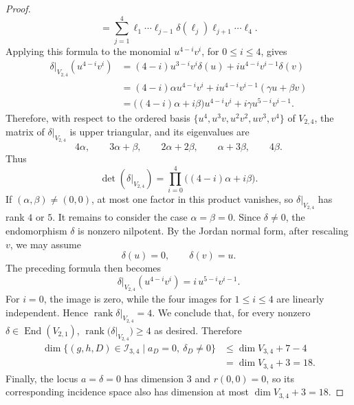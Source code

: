 \documentclass[10pt,a4paper]{amsart}
\DeclareMathOperator{\rank}{rank}
\numberwithin{equation}{section}
\theoremstyle{plain}
\theoremstyle{definition}
\theoremstyle{plain}
\theoremstyle{definition}
\begin{document}
\begin{proof}
\[=
\sum_{j=1}^4
\ell_1\cdots\ell_{j-1}\delta(\ell_j)
\ell_{j+1}\cdots\ell_4.
\]
Applying this formula to the monomial \(u^{4-i}v^i\), for
\(0\le i\le4\), gives
\[
\begin{aligned}
\delta|_{V_{2,4}}(u^{4-i}v^i)
&=(4-i)u^{3-i}v^i\delta(u)
  +i u^{4-i}v^{i-1}\delta(v)\\
&=(4-i)\alpha u^{4-i}v^i
  +i u^{4-i}v^{i-1}(\gamma u+\beta v)\\
&=\bigl((4-i)\alpha+i\beta\bigr)u^{4-i}v^i
  +i\gamma u^{5-i}v^{i-1}.
\end{aligned}
\]
Therefore, with respect to the ordered basis $\{u^4, u^3v, u^2v^2, uv^3,v^4\}$ of $V_{2,4}$, the matrix of $\delta|_{V_{2,4}}$ is upper triangular, and its eigenvalues are
\[
4\alpha,\qquad
3\alpha+\beta,\qquad
2\alpha+2\beta,\qquad
\alpha+3\beta,\qquad
4\beta.
\]
Thus
\[
   \det(\delta|_{V_{2,4}})
   =\prod_{i=0}^4\bigl((4-i)\alpha+i\beta\bigr).
\]
If $(\alpha,\beta)\ne(0,0)$, at most one factor in this product vanishes, so $\delta|_{V_{2,4}}$ has rank $4$ or $5$. It remains to consider the case $
\alpha=\beta=0.$ Since \(\delta\neq0\), the endomorphism \(\delta\) is nonzero
nilpotent. By the Jordan normal form, after rescaling \(v\), we may
assume
\[
\delta(u)=0,
\qquad
\delta(v)=u.
\]
The preceding formula then becomes
\[
\delta|_{V_{2,4}}(u^{4-i}v^i)
=
i\,u^{5-i}v^{i-1}.
\]
For \(i=0\), the image is zero, while the four images for $1\le i\le4$ are linearly independent. Hence
$\rank\delta|_{V_{2,4}}=4$.  We conclude that, for every nonzero
\(\delta\in\operatorname{End}(V_{2,1})\), $\rank\bigl(\delta|_{V_{2,4}})\ge4$ as desired. Therefore
\begin{align*}
   \dim\{(g,h,D) \in \mathcal{I}_{3,4}\mid a_D=0,\ \delta_D\ne0\}
   &\le\dim V_{3,4}+7-4\\
   &=\dim V_{3,4}+3=18.
\end{align*}
Finally, the locus $a=\delta=0$ has dimension $3$ and $r(0,0)=0$, so its corresponding incidence space also has dimension at most $\dim V_{3,4}+3=18$.
\end{proof}
\end{document}
